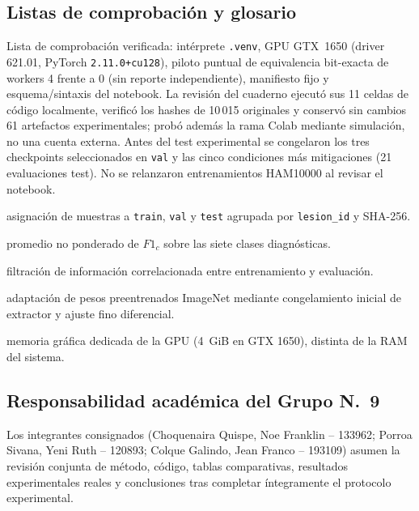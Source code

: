 \subsection{Listas de comprobación y glosario}
{\small\setlength{\parskip}{3pt}
Lista de comprobación verificada: intérprete \texttt{.venv}, GPU GTX~1650 (driver 621.01, PyTorch \texttt{2.11.0+cu128}), piloto puntual de equivalencia bit-exacta de workers 4 frente a 0 (sin reporte independiente), manifiesto fijo y esquema/sintaxis del notebook. La revisión del cuaderno ejecutó sus 11 celdas de código localmente, verificó los hashes de 10\,015 originales y conservó sin cambios 61 artefactos experimentales; probó además la rama Colab mediante simulación, no una cuenta externa. Antes del test experimental se congelaron los tres checkpoints seleccionados en \texttt{val} y las cinco condiciones más mitigaciones (21 evaluaciones test). No se relanzaron entrenamientos HAM10000 al revisar el notebook.

\begin{description}[leftmargin=1.4em,itemsep=1pt,topsep=3pt]
\item[Split:] asignación de muestras a \texttt{train}, \texttt{val} y \texttt{test} agrupada por \texttt{lesion\_id} y SHA-256.
\item[Macro F1:] promedio no ponderado de $F1_c$ sobre las siete clases diagnósticas.
\item[Leakage:] filtración de información correlacionada entre entrenamiento y evaluación.
\item[Transfer learning:] adaptación de pesos preentrenados ImageNet mediante congelamiento inicial de extractor y ajuste fino diferencial.
\item[VRAM:] memoria gráfica dedicada de la GPU (4~GiB en GTX 1650), distinta de la RAM del sistema.
\end{description}

\subsection{Responsabilidad académica del Grupo N.\ 9}
Los integrantes consignados (Choquenaira Quispe, Noe Franklin -- 133962; Porroa Sivana, Yeni Ruth -- 120893; Colque Galindo, Jean Franco -- 193109) asumen la revisión conjunta de método, código, tablas comparativas, resultados experimentales reales y conclusiones tras completar íntegramente el protocolo experimental.
}
